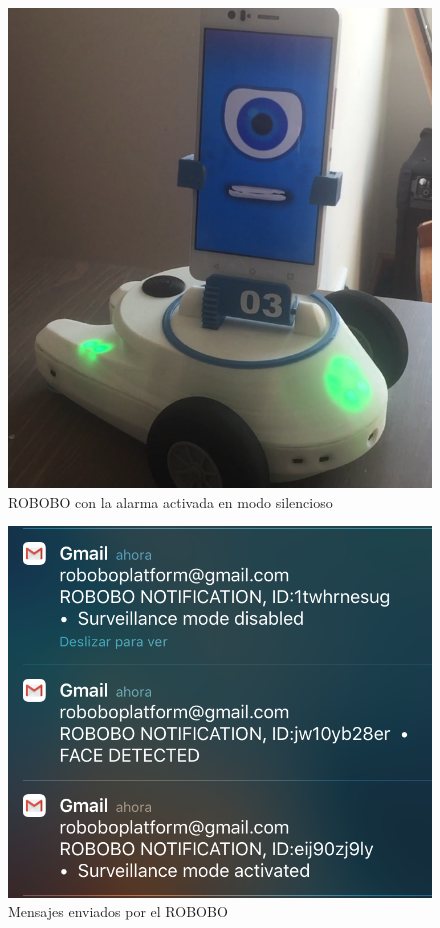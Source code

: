 \begin{figure}
\begin{minipage}{0.45\textwidth}
\end{minipage}\hfill
\begin{minipage}{0.45\textwidth}
\centering
\includegraphics[width=1\linewidth]{imagenes/vigilante_silentmode_alarm.png}

\caption{ROBOBO con la alarma activada en modo silencioso}
\label{fig:vigilante-silentmode}

\end{minipage}
\end{figure}


\begin{figure}[h]
	\centering
	\includegraphics[width=0.6\linewidth]{imagenes/vigilante_mails.png}
	\caption{Mensajes enviados por el ROBOBO}
	\label{fig:vigilante-mails}
\end{figure} 



